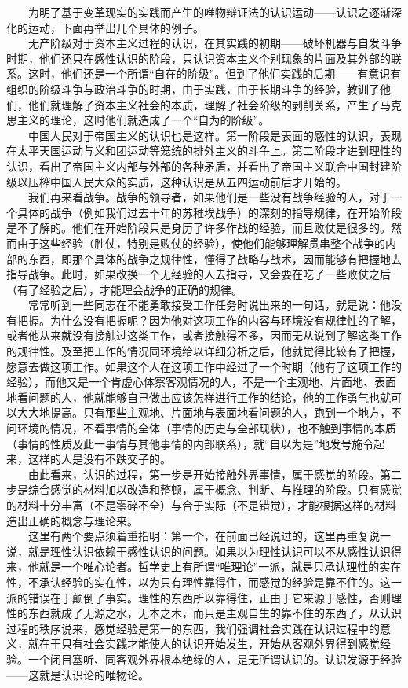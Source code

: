 \documentclass[cn,11pt,chinese]{elegantbook}
\begin{document}
　　为明了基于变革现实的实践而产生的唯物辩证法的认识运动——认识之逐渐深化的运动，下面再举出几个具体的例子。\\
　　无产阶级对于资本主义过程的认识，在其实践的初期——破坏机器与自发斗争时期，他们还只在感性认识的阶段，只认识资本主义个别现象的片面及其外部的联系。这时，他们还是一个所谓“自在的阶级”。但到了他们实践的后期——有意识有组织的阶级斗争与政治斗争的时期，由于实践，由于长期斗争的经验，教训了他们，他们就理解了资本主义社会的本质，理解了社会阶级的剥削关系，产生了马克思主义的理论，这时他们就造成了一个“自为的阶级”。\\
　　中国人民对于帝国主义的认识也是这样。第一阶段是表面的感性的认识，表现在太平天国运动与义和团运动等笼统的排外主义的斗争上。第二阶段才进到理性的认识，看出了帝国主义内部与外部的各种矛盾，并看出了帝国主义联合中国封建阶级以压榨中国人民大众的实质，这种认识是从五四运动前后才开始的。\\
　　我们再来看战争。战争的领导者，如果他们是一些没有战争经验的人，对于一个具体的战争（例如我们过去十年的苏稚埃战争）的深刻的指导规律，在开始阶段是不了解的。他们在开始阶段只是身历了许多作战的经验，而且败仗是很多的。然而由于这些经验（胜仗，特别是败仗的经验），使他们能够理解贯串整个战争的内部的东西，即那个具体的战争之规律性，懂得了战略与战术，因而能够有把握地去指导战争。此时，如果改换一个无经验的人去指导，又会要在吃了一些败仗之后（有了经验之后），才能理会战争的正确的规律。\\
　　常常听到一些同志在不能勇敢接受工作任务时说出来的一句话，就是说：他没有把握。为什么没有把握呢？因为他对这项工作的内容与环境没有规律性的了解，或者他从来就没有接触过这类工作，或者接触得不多，因而无从说到了解这类工作的规律性。及至把工作的情况同环境给以详细分析之后，他就觉得比较有了把握，愿意去做这项工作。如果这个人在这项工作中经过了一个时期（他有了这项工作的经验），而他又是一个肯虚心体察客观情况的人，不是一个主观地、片面地、表面地看问题的人，他就能够自己做出应该怎样进行工作的结论，他的工作勇气也就可以大大地提高。只有那些主观地、片面地与表面地看问题的人，跑到一个地方，不问环境的情况，不看事情的全体（事情的历史与全部现状），也不触到事情的本质（事情的性质及此一事情与其他事情的内部联系），就“自以为是”地发号施令起来，这样的人是没有不跌交子的。\\
　　由此看来，认识的过程，第一步是开始接触外界事情，属于感觉的阶段。第二步是综合感觉的材料加以改造和整顿，属于概念、判断、与推理的阶段。只有感觉的材料十分丰富（不是零碎不全）与合于实际（不是错觉），才能根据这样的材料造出正确的概念与理论来。\\
　　这里有两个要点须着重指明：第一个，在前面已经说过的，这里再重复说一说，就是理性认识依赖于感性认识的问题。如果以为理性认识可以不从感性认识得来，他就是一个唯心论者。哲学史上有所谓“唯理论”一派，就是只承认理性的实在性，不承认经验的实在性，以为只有理性靠得住，而感觉的经验是靠不住的。这一派的错误在于颠倒了事实。理性的东西所以靠得住，正由于它来源于感性，否则理性的东西就成了无源之水，无本之木，而只是主观自生的靠不住的东西了，从认识过程的秩序说来，感觉经验是第一的东西，我们强调社会实践在认识过程中的意义，就在于只有社会实践才能使人的认识开始发生，开始从客观外界得到感觉经验。一个闭目塞听、同客观外界根本绝缘的人，是无所谓认识的。认识发源于经验——这就是认识论的唯物论。\\
\end{document}

